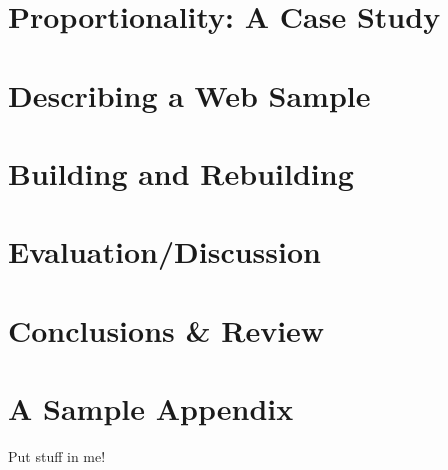 \documentclass[11pt,oneside,a4paper,onecolumn,titlepage,draft]{lancsthesis}
\begin{document}
\chapter{Proportionality: A Case Study}




\chapter{Describing a Web Sample}



\chapter{Building and Rebuilding}


\chapter{Evaluation/Discussion}


\chapter{Conclusions \& Review}



\pagebreak%
%
\backmatter%



\pagebreak
\appendix
{}


\chapter{A Sample Appendix}
Put stuff in me!


\end{document}
